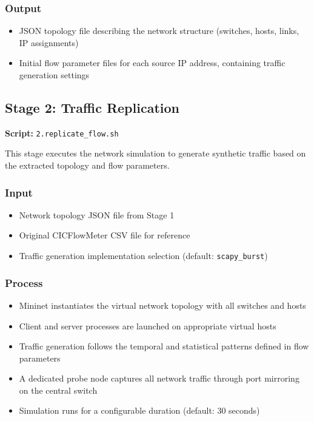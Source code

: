 \documentclass[11pt,a4paper]{article}
\begin{document}
\subsubsection{Output}
\begin{itemize}
    \item JSON topology file describing the network structure (switches, hosts, links, IP assignments)
    \item Initial flow parameter files for each source IP address, containing traffic generation settings
\end{itemize}

\subsection{Stage 2: Traffic Replication}

\textbf{Script:} \texttt{2.replicate\_flow.sh}

This stage executes the network simulation to generate synthetic traffic based on the extracted topology and flow parameters.

\subsubsection{Input}
\begin{itemize}
    \item Network topology JSON file from Stage 1
    \item Original CICFlowMeter CSV file for reference
    \item Traffic generation implementation selection (default: \texttt{scapy\_burst})
\end{itemize}

\subsubsection{Process}
\begin{itemize}
    \item Mininet instantiates the virtual network topology with all switches and hosts
    \item Client and server processes are launched on appropriate virtual hosts
    \item Traffic generation follows the temporal and statistical patterns defined in flow parameters
    \item A dedicated probe node captures all network traffic through port mirroring on the central switch
    \item Simulation runs for a configurable duration (default: 30 seconds)
\end{itemize}
\end{document}
